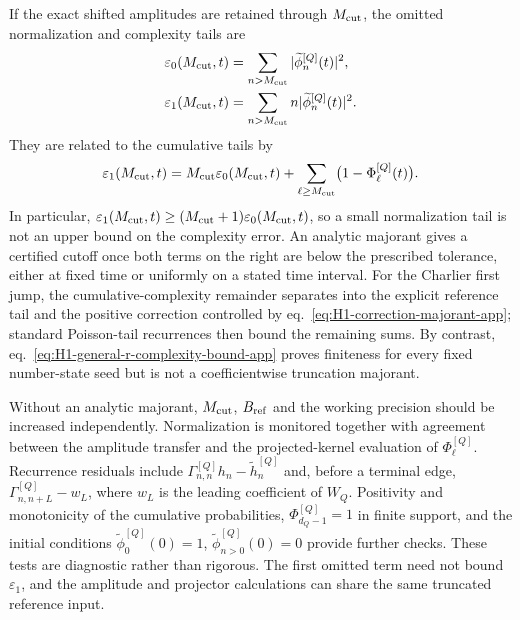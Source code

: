 \documentclass[a4paper,11pt]{article}
\theoremstyle{definition}
\theoremstyle{remark}
\newcommand{\tphi}{\widetilde\phi}
\newcommand{\thh}{\widetilde h}
\begin{document}
If the exact shifted amplitudes are retained through $M_{\rm cut}$, the
omitted normalization and complexity tails are
\begin{equation}
\begin{aligned}
   \varepsilon_0(M_{\rm cut},t)
   &=\sum_{n>M_{\rm cut}}|\tphi_n^{[Q]}(t)|^2,\\
   \varepsilon_1(M_{\rm cut},t)
   &=\sum_{n>M_{\rm cut}}n|\tphi_n^{[Q]}(t)|^2.
\end{aligned}
   \label{eq:numerical-tail-errors-app}
\end{equation}
They are related to the cumulative tails by
\begin{equation}
   \varepsilon_1(M_{\rm cut},t)
   =M_{\rm cut}\varepsilon_0(M_{\rm cut},t)
   +\sum_{\ell\ge M_{\rm cut}}
      \bigl(1-\Phi_\ell^{[Q]}(t)\bigr).
   \label{eq:numerical-tail-decomposition-app}
\end{equation}
In particular,
$\varepsilon_1(M_{\rm cut},t)
\ge(M_{\rm cut}+1)\varepsilon_0(M_{\rm cut},t)$, so a small
normalization tail is not an upper bound on the complexity error.
An analytic majorant gives a certified cutoff once both terms on the
right are below the prescribed tolerance, either at fixed time or
uniformly on a stated time interval.  For the Charlier first jump, the
cumulative-complexity remainder separates into the explicit reference
tail and the positive correction controlled by
eq.~\eqref{eq:H1-correction-majorant-app}; standard Poisson-tail
recurrences then bound the remaining sums.  By contrast,
eq.~\eqref{eq:H1-general-r-complexity-bound-app} proves finiteness for
every fixed number-state seed but is not a coefficientwise truncation
majorant.

Without an analytic majorant, $M_{\rm cut}$, $B_{\rm ref}$ and the
working precision should be increased independently.  Normalization is
monitored together with agreement between the amplitude transfer and
the projected-kernel evaluation of $\Phi_\ell^{[Q]}$.  Recurrence
residuals include
$\Gamma_{n,n}^{[Q]}h_n-\thh_n^{[Q]}$ and, before a terminal edge,
$\Gamma_{n,n+L}^{[Q]}-w_L$, where $w_L$ is the leading coefficient of
$W_Q$.  Positivity and monotonicity of the cumulative probabilities,
$\Phi_{d_Q-1}^{[Q]}=1$ in finite support, and the initial conditions
$\tphi_0^{[Q]}(0)=1$, $\tphi_{n>0}^{[Q]}(0)=0$ provide further checks.
These tests are diagnostic rather than rigorous.  The first omitted
term need not bound $\varepsilon_1$, and the amplitude and projector
calculations can share the same truncated reference input.
\end{document}
